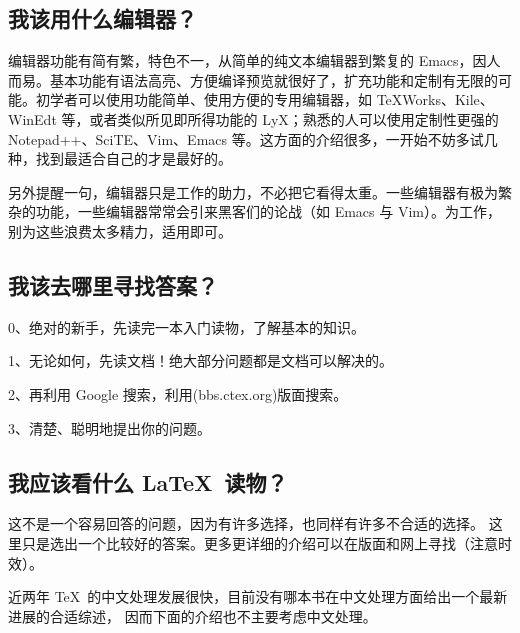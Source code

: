 \subsection{我该用什么编辑器？}

编辑器功能有简有繁，特色不一，从简单的纯文本编辑器到繁复的 Emacs，因人而易。基本功能有语法高亮、方便编译预览就很好了，扩充功能和定制有无限的可能。初学者可以使用功能简单、使用方便的专用编辑器，如 TeXWorks、Kile、WinEdt 等，或者类似所见即所得功能的 LyX；熟悉的人可以使用定制性更强的 Notepad++、SciTE、Vim、Emacs 等。这方面的介绍很多，一开始不妨多试几种，找到最适合自己的才是最好的。

另外提醒一句，编辑器只是工作的助力，不必把它看得太重。一些编辑器有极为繁杂的功能，一些编辑器常常会引来黑客们的论战（如 Emacs 与 Vim）。为工作，别为这些浪费太多精力，适用即可。

\subsection{我该去哪里寻找答案？}

0、绝对的新手，先读完一本入门读物，了解基本的知识。

1、无论如何，先读文档！绝大部分问题都是文档可以解决的。

2、再利用 Google 搜索，利用(bbs.ctex.org)版面搜索。

3、清楚、聪明地提出你的问题。


\subsection{我应该看什么 \LaTeX\ 读物？}

这不是一个容易回答的问题，因为有许多选择，也同样有许多不合适的选择。
这里只是选出一个比较好的答案。更多更详细的介绍可以在版面和网上寻找（注意时效）。

近两年 \TeX\ 的中文处理发展很快，目前没有哪本书在中文处理方面给出一个最新进展的合适综述，
因而下面的介绍也不主要考虑中文处理。

